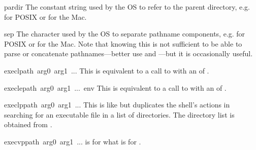 \begin{datadesc}{pardir}
The constant string used by the OS to refer to the parent directory,
e.g.  for POSIX or  for the Mac.
\end{datadesc}

\begin{datadesc}{sep}
The character used by the OS to separate pathname components, e.g.
 for POSIX or  for the Mac.  Note that knowing this
is not sufficient to be able to parse or concatenate pathnames---better
use  and ---but it is
occasionally useful.
\end{datadesc}

\begin{funcdesc}{execl}{path\, arg0\, arg1\, ...}
This is equivalent to a call to  with an 
of .
\end{funcdesc}

\begin{funcdesc}{execle}{path\, arg0\, arg1\, ...\, env}
This is equivalent to a call to  with an 
of .
\end{funcdesc}

\begin{funcdesc}{execlp}{path\, arg0\, arg1\, ...}
This is like  but duplicates the shell's actions in
searching for an executable file in a list of directories.  The
directory list is obtained from .
\end{funcdesc}

\begin{funcdesc}{execvp}{path\, arg0\, arg1\, ...}
 is for  what  is for .
\end{funcdesc}
